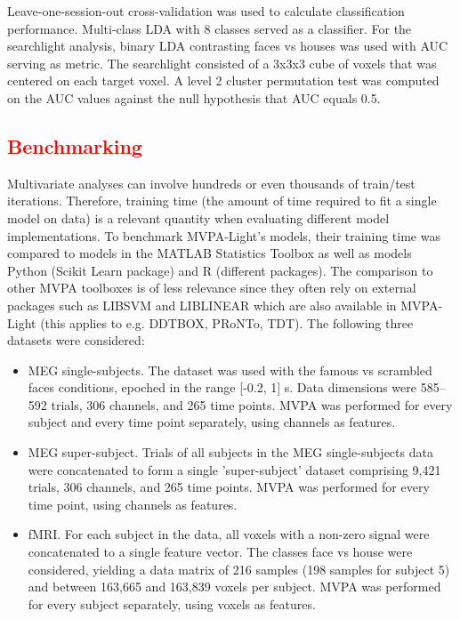 \documentclass[utf8]{frontiersSCNS} %
\newcommand{\red}[1]{\textcolor{red}{#1}}
\begin{document}
 Leave-one-session-out cross-validation was used to calculate classification performance. Multi-class LDA with 8 classes served as a classifier. For the searchlight analysis, binary LDA contrasting faces vs houses was used with AUC serving as metric. The searchlight consisted of a 3x3x3 cube of voxels that was centered on each target voxel. A level 2 cluster permutation test was computed on the AUC values against the null hypothesis that AUC equals 0.5. 

\red{\subsection{Benchmarking}}

Multivariate analyses can involve hundreds or even thousands of train/test iterations. Therefore,  training time (the amount of time required to fit a single model on data) is a relevant quantity when evaluating different model implementations. To benchmark MVPA-Light's models, their training time was compared to models in the MATLAB Statistics Toolbox as well as models Python (Scikit Learn package) and R (different packages). The comparison to other MVPA toolboxes is of less relevance since they often rely on external packages such as LIBSVM and LIBLINEAR which are also available in MVPA-Light (this applies to e.g. DDTBOX, PRoNTo, TDT). The following three datasets were considered:


\begin{itemize}
    \item MEG single-subjects. The \cite{Wakeman2015ADataset} dataset was used with the famous vs scrambled faces conditions, epoched in the range [-0.2, 1] s. Data dimensions were 585--592 trials, 306 channels, and 265 time points. MVPA was performed for every subject and every time point separately, using channels as features.
    \item MEG super-subject. Trials of all subjects in the MEG single-subjects data were concatenated to form a single 'super-subject' dataset comprising 9,421 trials, 306 channels, and 265 time points. MVPA was performed for every time point, using channels as features.
    \item fMRI. For each subject in the \cite{Haxby2001} data, all voxels with a non-zero signal were concatenated to a single feature vector. The classes face vs house were considered, yielding a data matrix of 216 samples (198 samples for subject 5) and between 163,665 and 163,839 voxels per subject. MVPA was performed for every subject separately, using voxels as features.
\end{itemize}
\end{document}
